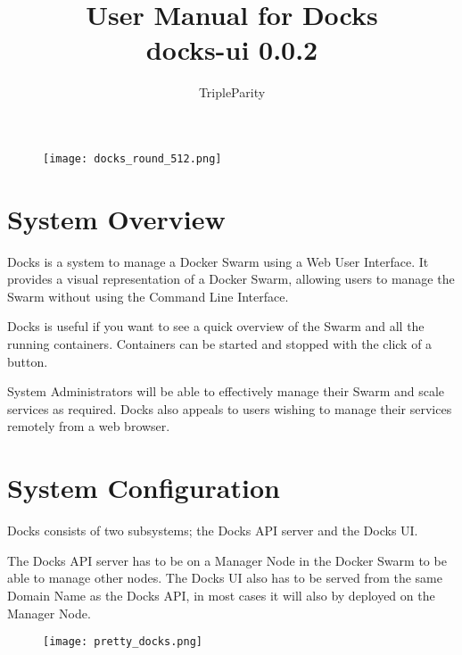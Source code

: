 \documentclass[]{article}
\title{User Manual for Docks\\
\large{docks-ui 0.0.2}}
\author{TripleParity}
\date{}
\begin{document}
\maketitle

\begin{figure}[H]
	\texttt{[image: docks\_round\_512.png]}
	\centering
\end{figure}

\tableofcontents

\section{System Overview}
Docks is a system to manage a Docker Swarm using a Web User Interface. It provides a visual representation of a Docker Swarm, allowing users to manage the Swarm without using the Command Line Interface.

Docks is useful if you want to see a quick overview of the Swarm and all the running containers. Containers can be started and stopped with the click of a button.

System Administrators will be able to effectively manage their Swarm and scale services as required. Docks also appeals to users wishing to manage their services remotely from a web browser.

\section{System Configuration}
Docks consists of two subsystems; the Docks API server and the Docks UI.

The Docks API server has to be on a Manager Node in the Docker Swarm to be able to manage other nodes. The Docks UI also has to be served from the same Domain Name as the Docks API, in most cases it will also by deployed on the Manager Node.

\begin{figure}[h!]
	\centering
	\texttt{[image: pretty\_docks.png]}
\end{figure}

\pagebreak
\end{document}
